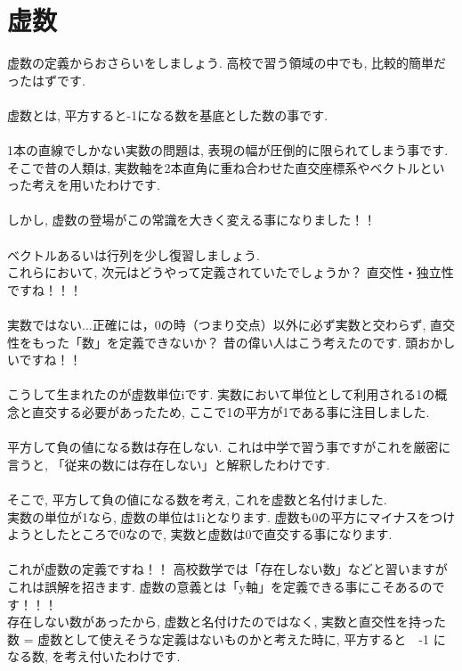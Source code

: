 \documentclass[11pt,a4paper]{jreport}
\begin{document}
\section{虚数}
虚数の定義からおさらいをしましょう. 高校で習う領域の中でも, 比較的簡単だったはずです.\\
\\
虚数とは, 平方すると-1になる数を基底とした数の事です.\\
\\
1本の直線でしかない実数の問題は, 表現の幅が圧倒的に限られてしまう事です. そこで昔の人類は, 実数軸を2本直角に重ね合わせた直交座標系やベクトルといった考えを用いたわけです.\\
\\
しかし, 虚数の登場がこの常識を大きく変える事になりました！！\\
\\
ベクトルあるいは行列を少し復習しましょう.\\
これらにおいて, 次元はどうやって定義されていたでしょうか？ 直交性・独立性ですね！！！\\
\\
実数ではない...正確には，0の時（つまり交点）以外に必ず実数と交わらず, 直交性をもった「数」を定義できないか？
昔の偉い人はこう考えたのです. 頭おかしいですね！！\\
\\
こうして生まれたのが虚数単位iです. 実数において単位として利用される1の概念と直交する必要があったため, ここで1の平方が1である事に注目しました. \\
\\
平方して負の値になる数は存在しない. これは中学で習う事ですがこれを厳密に言うと, 「従来の数には存在しない」と解釈したわけです.\\
\\
そこで, 平方して負の値になる数を考え, これを虚数と名付けました.\\
実数の単位が1なら, 虚数の単位は1iとなります. 虚数も0の平方にマイナスをつけようとしたところで0なので, 実数と虚数は0で直交する事になります.\\
\\
これが虚数の定義ですね！！ 高校数学では「存在しない数」などと習いますがこれは誤解を招きます. 虚数の意義とは「y軸」を定義できる事にこそあるのです！！！\\
存在しない数があったから, 虚数と名付けたのではなく, 実数と直交性を持った数 = 虚数として使えそうな定義はないものかと考えた時に, 平方すると　-1 になる数, を考え付いたわけです.
\end{document}
